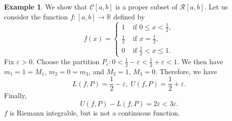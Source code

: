 \documentclass[15pt,a4paper]{book}
\theoremstyle{definition}
\newtheorem{example}[theorem]{Example}
\newcommand{\R}{\mathbb{R}} %
\newcommand{\cR}{\mathcal{R}}
\newcommand{\cC}{\mathcal{C}}
\begin{document}
\begin{example}
    We show that $\cC[a,b]$ is a proper subset of $\cR[a,b]$. Let us consider the function $f:[a,b] \to \R$ defined by
    \begin{equation}
        f(x) = \begin{cases}
        1 &\text{ if } 0 \leq x < \frac{1}{2}, \\
        \frac{1}{2} &\text{ if } x = \frac{1}{2}, \\
        0 &\text{ if } \frac{1}{2} < x \leq 1.
        \end{cases}
    \end{equation}
    Fix $\varepsilon > 0$. Choose the partition $P_{\varepsilon} : 0 < \frac{1}{2}-\varepsilon < \frac{1}{2} + \varepsilon < 1$. We then have $m_{1} = 1 = M_{1}$, $m_{2} = 0 = m_{3}$, and $M_{2} = 1$, $M_{3} = 0$. Therefore, we have
    \begin{equation}
        L(f,P) = \frac{1}{2}-\varepsilon, \; U(f,P) = \frac{1}{2} + \varepsilon.
    \end{equation}
    Finally,
    \begin{equation}
        U(f,P) - L(f,P) = 2\varepsilon < 3\varepsilon.
    \end{equation}
    $f$ is Riemann integrable, but is not a continuous function.
\end{example}


\end{document}
